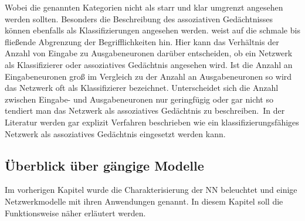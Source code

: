 Wobei die genannten Kategorien nicht als starr und klar umgrenzt angesehen werden sollten. Besonders die Beschreibung des assoziativen Gedächtnisses können ebenfalls als Klassifizierungen angesehen werden. \citet{Gurney1997} weist auf die schmale bis fließende Abgrenzung der Begrifflichkeiten hin. Hier kann das Verhältnis der Anzahl von Eingabe zu Ausgabeneuronen darüber entscheiden, ob ein Netzwerk als Klassifizierer oder assoziatives Gedächtnis angesehen wird. Ist die Anzahl an Eingabeneuronen groß im Vergleich zu der Anzahl an Ausgabeneuronen so wird das Netzwerk oft als Klassifizierer bezeichnet. Unterscheidet sich die Anzahl zwischen Eingabe- und Ausgabeneuronen nur geringfügig oder gar nicht so tendiert man das Netzwerk als assoziatives Gedächtnis zu beschreiben.\, In der Literatur werden gar explizit Verfahren beschrieben wie ein klassifizierungsfähiges Netzwerk als assoziatives Gedächtnis eingesetzt werden kann.\,




\subsection{Überblick über gängige Modelle}
Im vorherigen Kapitel wurde die Charakterisierung der NN beleuchtet und einige Netzwerkmodelle mit ihren Anwendungen genannt. In diesem Kapitel soll die Funktionsweise näher erläutert werden.

